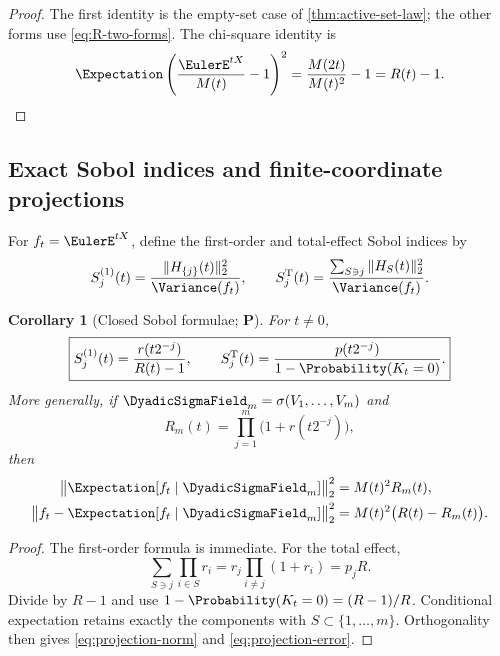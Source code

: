 \documentclass[11pt,oneside]{article}
\newtheorem{corollary}[theorem]{Corollary}
\theoremstyle{definition}
\theoremstyle{remark}
\newcommand{\statusP}{\textcolor{deepgreen}{\textbf{P}}}
\begin{document}
\begin{proof}
The first identity is the empty-set case of \cref{thm:active-set-law}; the
other forms use \eqref{eq:R-two-forms}.  The chi-square identity is
\[
 \Expectation\left(\frac{\EulerE^{tX}}{M(t)}-1\right)^2
 =\frac{M(2t)}{M(t)^2}-1=R(t)-1.
\]
\end{proof}

\subsection{Exact Sobol indices and finite-coordinate projections}

For $f_t=\EulerE^{tX}$, define the first-order and total-effect Sobol indices by
\begin{equation}
 S_j^{(1)}(t)=\frac{\|H_{\{j\}}(t)\|_2^2}{\Variance(f_t)},
 \qquad
 S_j^{\mathrm T}(t)=
 \frac{\sum_{S\ni j}\|H_S(t)\|_2^2}{\Variance(f_t)}.
 \label{eq:Sobol-def}
\end{equation}

\begin{corollary}[Closed Sobol formulae; \statusP]
\label{cor:Sobol}
For $t\ne0$,
\begin{equation}
 \boxed{
 S_j^{(1)}(t)=\frac{r(t2^{-j})}{R(t)-1},
 \qquad
 S_j^{\mathrm T}(t)=
 \frac{p(t2^{-j})}{1-\Probability(K_t=0)}.}
 \label{eq:Sobol-closed}
\end{equation}
More generally, if $\DyadicSigmaField_m=\sigma(V_1,\ldots,V_m)$ and
\begin{equation}
 R_m(t)=\prod_{j=1}^m\bigl(1+r(t2^{-j})\bigr),
 \label{eq:R-m}
\end{equation}
then
\begin{align}
 \bigl\|\Expectation[f_t\mid\DyadicSigmaField_m]\bigr\|_2^2&=M(t)^2R_m(t),
 \label{eq:projection-norm}\\
 \bigl\|f_t-\Expectation[f_t\mid\DyadicSigmaField_m]\bigr\|_2^2
 &=M(t)^2\bigl(R(t)-R_m(t)\bigr).
 \label{eq:projection-error}
\end{align}
\end{corollary}

\begin{proof}
The first-order formula is immediate.  For the total effect,
\[
 \sum_{S\ni j}\prod_{i\in S}r_i
 =r_j\prod_{i\ne j}(1+r_i)=p_jR.
\]
Divide by $R-1$ and use $1-\Probability(K_t=0)=(R-1)/R$.
Conditional expectation retains exactly the components with
$S\subset\{1,\ldots,m\}$.  Orthogonality then gives
\eqref{eq:projection-norm} and \eqref{eq:projection-error}.
\end{proof}
\end{document}
